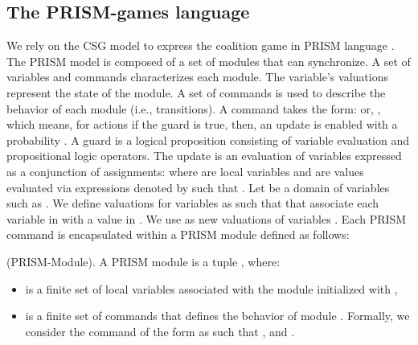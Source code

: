 \subsection{The PRISM-games language}
We rely on the CSG model to express the coalition game in PRISM language \cite{Kwiatkowskaprism2011}. The PRISM model is composed of a set of modules that can synchronize. A set of variables and commands characterizes each module. The variable's valuations represent the state of the module. A set of commands is used to describe the behavior of each module (i.e., transitions). A command takes the form:  or, , which means, for actions  if the guard  is true, then, an update  is enabled with a probability . A guard is a logical proposition consisting of variable evaluation and propositional logic operators. The update  is an evaluation of variables expressed as a conjunction of assignments:  where  are local variables and  are values evaluated via expressions denoted by  such that .
Let  be a domain of variables such as . We define valuations for variables as \quot{\emath{\theta}} such that  that associate each variable in  with a value in . We use  as new valuations of variables . Each PRISM command is encapsulated within a PRISM module \cite{KWIATKOWSKA20065} defined as follows:

\begin{mydef} \label{def:prismmodule} \normalfont (PRISM-Module). A PRISM module  is a tuple , where: 
 \begin{itemize}
\item {} is a finite set of local variables associated with the module  initialized with ,
\item {} is a finite set of commands that defines the behavior of module . Formally, we consider the command of the form  as  such that ,  and .
            \end{itemize}
\end{mydef}

